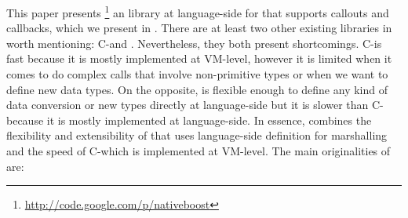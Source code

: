 


This paper presents \NBFFI\footnote{\url{http://code.google.com/p/nativeboost}} an \FFI library at language-side for \PH that supports callouts and callbacks, which we present in .
There are at least two other existing \FFI libraries in \PH worth mentioning: C-\FFI and \Alien.
Nevertheless, they both present shortcomings.
C-\FFI is fast because it is mostly implemented at VM-level, however it is limited when it comes to do complex calls that involve non-primitive types or when we want to define new data types.
On the opposite, \Alien \FFI is flexible enough to define any kind of data conversion or new types directly at language-side but it is slower than C-\FFI because it is mostly implemented at language-side.
In essence, \NBFFI combines the flexibility and extensibility of \Alien that uses language-side definition for marshalling and the speed of C-\FFI which is implemented at VM-level.
The main originalities of \NBFFI are:

